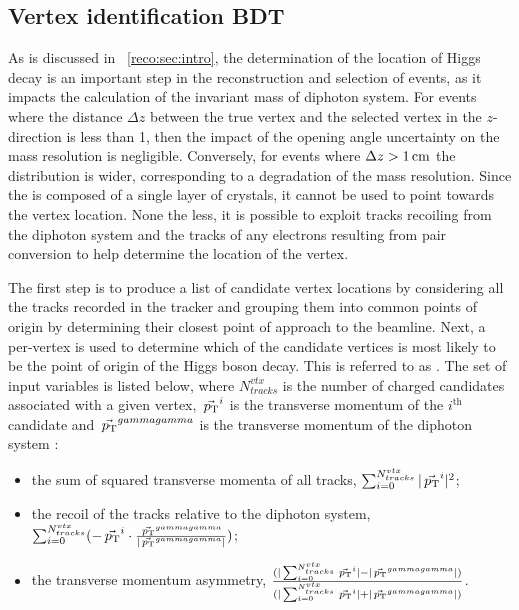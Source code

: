 \subsection{Vertex identification BDT}
As is discussed in \Sec~\ref{reco:sec:intro}, the determination of the location of Higgs decay is an important step in the reconstruction and selection of \Hgg events, as it impacts the calculation of the invariant mass of diphoton system. For events where the distance $\Delta z$ between the true vertex and the selected vertex in the $z$-direction is less than 1\cm, then the impact of the opening angle uncertainty on the mass resolution is negligible. Conversely, for events where $\Delta z>1\,\text{cm}$ the \mgg distribution is wider, corresponding to a degradation of the mass resolution. %
Since the \CMS \ECAL is composed of a single layer of crystals, it cannot be used to point towards the vertex location. %
None the less, it is possible to exploit tracks recoiling from the diphoton system and the tracks of any electrons resulting from pair conversion to help determine the location of the vertex.

The first step is to produce a list of candidate vertex locations by considering all the tracks recorded in the tracker and grouping them into common points of origin by determining their closest point of approach to the beamline. Next, a per-vertex \BDT is used to determine which of the candidate vertices is most likely to be the point of origin of the Higgs boson decay. This \BDT is referred to as \VtxIdBdt. The set of input variables is listed below, where $N_{tracks}^{vtx}$ is the number of charged \PF candidates associated with a given vertex, $\vec{\,p_\text{T}}^i$ is the transverse momentum of the $i^{\textrm{th}}$ candidate and $\vec{\,p_\text{T}}^{gammagamma}$ is the transverse momentum of the diphoton system :
\begin{itemize}
\item the sum of squared transverse momenta of all tracks, $\sum_{i=0}^{N_{tracks}^{vtx}} | \vec{\,p_\text{T}}^{i} |^2$;
\item the recoil of the tracks relative to the diphoton system, $\sum_{i=0}^{N_{tracks}^{vtx}} (- \vec{\,p_\text{T}}^i \cdot \frac{\vec{\,p_\text{T}}^{gammagamma}}{|\vec{\,p_\text{T}}^{gammagamma}| })$;
\item the transverse momentum asymmetry, $\frac{(|\sum_{i=0}^{N_{tracks}^{vtx}} \vec{\,p_\text{T}}^i| - |\vec{\,p_\text{T}}^{gammagamma}|)}{(|\sum_{i=0}^{N_{tracks}^{vtx}} \vec{\,p_\text{T}}^i| + |\vec{\,p_\text{T}}^{gammagamma}|)}$.
\end{itemize}

